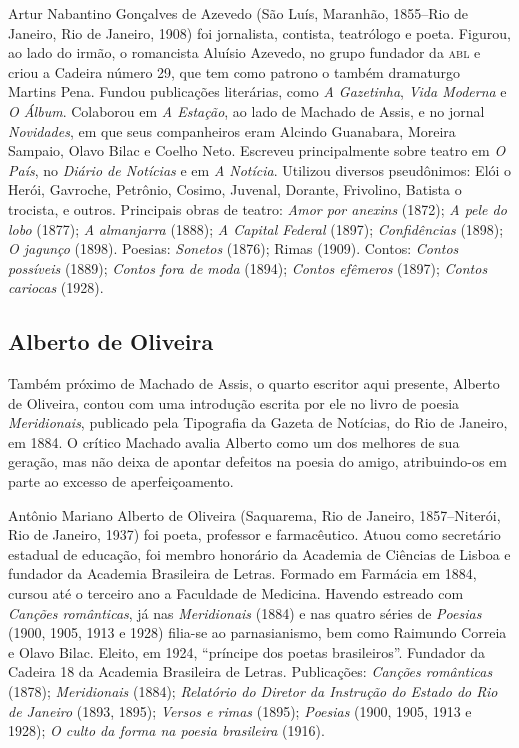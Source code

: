 Artur Nabantino Gonçalves de Azevedo (São Luís,
Maranhão, 1855--Rio de Janeiro, Rio de Janeiro, 1908) foi jornalista,
contista, teatrólogo e poeta. Figurou, ao lado do irmão, o romancista
Aluísio Azevedo, no grupo fundador da \textsc{abl} e criou a Cadeira número 29,
que tem como patrono o também dramaturgo Martins Pena. Fundou
publicações literárias, como \emph{A Gazetinha}, \emph{Vida Moderna} e
\emph{O Álbum}. Colaborou em \emph{A Estação}, ao lado de Machado de
Assis, e no jornal \emph{Novidades}, em que seus companheiros eram
Alcindo Guanabara, Moreira Sampaio, Olavo Bilac e Coelho Neto. Escreveu
principalmente sobre teatro em \emph{O País}, no \emph{Diário de
Notícias} e em \emph{A Notícia}. Utilizou diversos pseudônimos: Elói o
Herói, Gavroche, Petrônio, Cosimo, Juvenal, Dorante, Frivolino, Batista
o trocista, e outros. Principais obras de teatro: \emph{Amor por
anexins} (1872); \emph{A pele do lobo} (1877); \emph{A}
\emph{almanjarra} (1888); \emph{A Capital Federal} (1897);
\emph{Confidências} (1898); \emph{O jagunço} (1898). Poesias:
\emph{Sonetos} (1876); Rimas (1909). Contos: \emph{Contos possíveis}
(1889); \emph{Contos fora de moda} (1894); \emph{Contos efêmeros}
(1897); \emph{Contos cariocas} (1928).

\subsection{Alberto de Oliveira}

Também próximo de Machado de Assis, o quarto escritor aqui presente,
Alberto de Oliveira, contou com uma introdução escrita por ele no livro
de poesia \emph{Meridionais}, publicado pela Tipografia da Gazeta de
Notícias, do Rio de Janeiro, em 1884. O crítico Machado avalia Alberto
como um dos melhores de sua geração, mas não deixa de apontar defeitos
na poesia do amigo, atribuindo-os em parte ao excesso de
aperfeiçoamento.

Antônio Mariano Alberto de Oliveira (Saquarema, Rio de Janeiro,
1857--Niterói, Rio de Janeiro, 1937) foi poeta, professor e
farmacêutico. Atuou como secretário estadual de educação, foi membro
honorário da Academia de Ciências de Lisboa e fundador da Academia
Brasileira de Letras. Formado em Farmácia em 1884, cursou até o terceiro
ano a Faculdade de Medicina. Havendo estreado com \emph{Canções
românticas}, já nas \emph{Meridionais} (1884) e nas quatro séries de
\emph{Poesias} (1900, 1905, 1913 e 1928) filia-se ao parnasianismo, bem
como Raimundo Correia e Olavo Bilac. Eleito, em 1924, ``príncipe dos
poetas brasileiros''. Fundador da Cadeira 18 da Academia Brasileira de
Letras. Publicações: \emph{Canções românticas} (1878);
\emph{Meridionais} (1884); \emph{Relatório do Diretor da Instrução do
Estado do Rio de Janeiro} (1893, 1895); \emph{Versos e rimas} (1895);
\emph{Poesias} (1900, 1905, 1913 e 1928); \emph{O culto da forma na
poesia brasileira} (1916).

